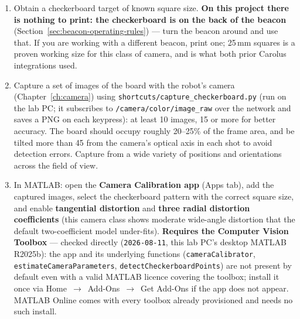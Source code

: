 \documentclass[11pt]{report}
\begin{document}
\begin{enumerate}
  \item Obtain a checkerboard target of known square size. \textbf{On this
  project there is nothing to print: the checkerboard is on the back of the
  beacon} (Section~\ref{sec:beacon-operating-rules}) --- turn the beacon
  around and use that. If you are working with a different beacon, print one;
  25\,mm squares is a proven working size for this class of camera, and is
  what both prior Carolus integrations used.
  \item Capture a set of images of the board with the robot's camera
  (Chapter~\ref{ch:camera}) using \texttt{shortcuts/capture\_checkerboard.py}
  (run on the lab PC; it subscribes to \texttt{/camera/color/image\_raw} over
  the network and saves a PNG on each keypress): at least 10 images, 15 or
  more for better accuracy. The board should occupy roughly 20--25\% of the
  frame area, and be tilted more than 45\textdegree{} from the camera's
  optical axis in each shot to avoid detection errors. Capture from a wide
  variety of positions and orientations across the field of view.
  \item In MATLAB: open the \textbf{Camera Calibration app} (Apps tab), add
  the captured images, select the checkerboard pattern with the correct
  square size, and enable \textbf{tangential distortion} and \textbf{three
  radial distortion coefficients} (this camera class shows moderate
  wide-angle distortion that the default two-coefficient model under-fits).
  \textbf{Requires the Computer Vision Toolbox} --- checked directly
  (\texttt{2026-08-11}, this lab PC's desktop MATLAB R2025b): the app and
  its underlying functions (\texttt{cameraCalibrator},
  \texttt{estimateCameraParameters}, \texttt{detectCheckerboardPoints}) are
  not present by default even with a valid MATLAB licence covering the
  toolbox; install it once via Home~$\to$~Add-Ons~$\to$~Get Add-Ons if the
  app does not appear. MATLAB Online comes with every toolbox already
  provisioned and needs no such install.


\end{enumerate}
\end{document}
